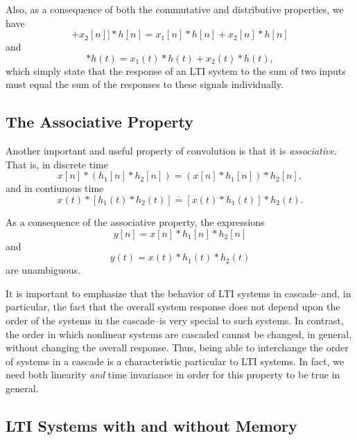 \documentclass[a4paper,10pt,twoside]{book}
\begin{document}
Also, as a consequence of both the commutative and distributive properties, we have
\begin{equation}
    [x_1[n]+x_2[n]]*h[n]=x_1[n]*h[n]+x_2[n]*h[n]
    \label{2.50}
\end{equation}
and
\begin{equation}
    [x_1(t)+x_2(t)]*h(t)=x_1(t)*h(t)+x_2(t)*h(t),
    \label{2.51}
\end{equation}
which simply state that the response of an LTI system to the sum of two inputs must equal the sum of the responses to these signals individually.

\subsection{The Associative Property}

Another important and useful property of convolution is that it is \textit{associative}. That is, in discrete time
\begin{equation}
    x[n]*(h_1[n]*h_2[n])=(x[n]*h_1[n])*h_2[n],
    \label{2.58}
\end{equation}
and in contiunous time
\begin{equation}
    x(t)*[h_1(t)*h_2(t)]\stackrel{\cdot}{=}[x(t)*h_1(t)]*h_2(t).
    \label{2.59}
\end{equation}

As a consequence of the associative property, the expressions
\begin{equation}
    y[n]=x[n]*h_1[n]*h_2[n]
    \label{2.60}
\end{equation}
and
\begin{equation}
    y(t)=x(t)*h_1(t)*h_2(t)
    \label{2.61}
\end{equation}
are unambiguous.

It is important to emphasize that the behavior of LTI systems in cascade--and, in particular, the fact that the overall system response does not depend upon the order of the systems in the cascade--is very special to such systems. In contrast, the order in which nonlinear systems are cascaded cannot be changed, in general, without changing the overall response. Thus, being able to interchange the order of systems in a cascade is a characteristic particular to LTI systems. In fact, we need both linearity \textit{and} time invariance in order for this property to be true in general.

\subsection{LTI Systems with and without Memory}
\end{document}
